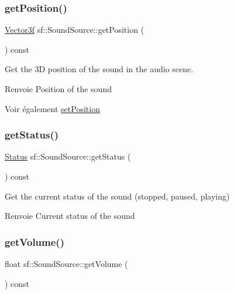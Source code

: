 \subsubsection{\texorpdfstring{get\+Position()}{getPosition()}}
{\footnotesize\ttfamily \hyperlink{classsf_1_1Vector3}{Vector3f} sf\+::\+Sound\+Source\+::get\+Position (\begin{DoxyParamCaption}{ }\end{DoxyParamCaption}) const}



Get the 3D position of the sound in the audio scene. 

\begin{DoxyReturn}{Renvoie}
Position of the sound
\end{DoxyReturn}
\begin{DoxySeeAlso}{Voir également}
\hyperlink{classsf_1_1SoundSource_a0480257ea25d986eba6cc3c1a6f8d7c2}{set\+Position} 
\end{DoxySeeAlso}
\mbox{\label{classsf_1_1SoundSource_a7e47072bd8b3982c708a6151f298d21a}} 
\subsubsection{\texorpdfstring{get\+Status()}{getStatus()}}
{\footnotesize\ttfamily \hyperlink{classsf_1_1SoundSource_ac43af72c98c077500b239bc75b812f03}{Status} sf\+::\+Sound\+Source\+::get\+Status (\begin{DoxyParamCaption}{ }\end{DoxyParamCaption}) const\hspace{0.3cm}{\ttfamily [protected]}}



Get the current status of the sound (stopped, paused, playing) 

\begin{DoxyReturn}{Renvoie}
Current status of the sound 
\end{DoxyReturn}
\mbox{\label{classsf_1_1SoundSource_a04243fb5edf64561689b1d58953fc4ce}} 
\subsubsection{\texorpdfstring{get\+Volume()}{getVolume()}}
{\footnotesize\ttfamily float sf\+::\+Sound\+Source\+::get\+Volume (\begin{DoxyParamCaption}{ }\end{DoxyParamCaption}) const}



